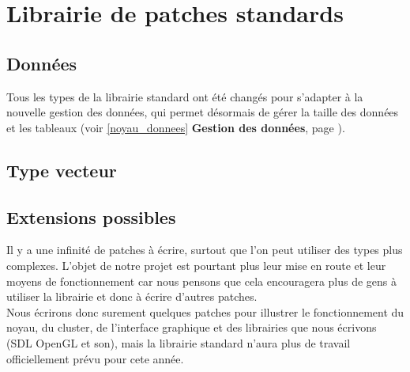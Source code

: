 
\chapter{Librairie de patches standards}

\section{Donn\'ees}

Tous les types de la librairie standard ont \'et\'e chang\'es pour
s'adapter \`a la nouvelle gestion des donn\'ees, qui permet d\'esormais
de g\'erer la taille des donn\'ees et les tableaux
(voir \ref{noyau_donnees} {\bf Gestion des donn\'ees},
 page \pageref{noyau_donnees}).\\


\section{Type vecteur}



\section{Extensions possibles}
Il y a une infinit\'e de patches \`a \'ecrire, surtout que l'on peut
utiliser des types plus complexes. L'objet de notre projet est pourtant
plus leur mise en route et leur moyens de fonctionnement car nous
pensons que cela encouragera plus de gens \`a utiliser
la librairie et donc \`a \'ecrire d'autres patches.\\

Nous \'ecrirons donc surement quelques patches pour illustrer le
fonctionnement du noyau, du cluster, de l'interface graphique et des
librairies que nous \'ecrivons (SDL OpenGL et son), mais la librairie
standard n'aura plus de travail officiellement pr\'evu pour cete ann\'ee.\\
